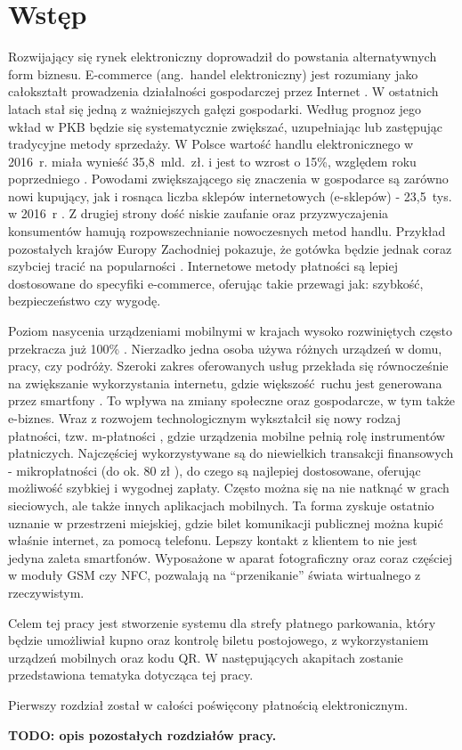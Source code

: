 \section*{Wstęp}

Rozwijający się rynek elektroniczny doprowadził do powstania alternatywnych form biznesu. E-commerce (ang.~handel elektroniczny) \cite{biblia_ebiznesu} jest rozumiany jako całokształt prowadzenia działalności gospodarczej przez Internet \cite{pieniadz_elektroniczny-analiza}. W ostatnich latach stał się jedną z ważniejszych gałęzi gospodarki. Według prognoz jego wkład w PKB będzie się systematycznie zwiększać, uzupełniając lub zastępując tradycyjne metody sprzedaży. W Polsce wartość handlu elektronicznego w 2016~r. miała wynieść 35,8~mld.~zł. i jest to wzrost o 15\%, względem roku poprzedniego \cite{barometr_radio}. Powodami zwiększającego się znaczenia w gospodarce są zarówno nowi kupujący, jak i rosnąca liczba sklepów internetowych (e-sklepów) - 23,5~tys. w 2016~r \cite{barometr_radio}. Z drugiej strony dość niskie zaufanie oraz przyzwyczajenia konsumentów hamują rozpowszechnianie nowoczesnych metod handlu. Przykład pozostałych krajów Europy Zachodniej pokazuje, że gotówka będzie jednak coraz szybciej tracić na popularności \cite{pieniadz_elektroniczny-analiza}. Internetowe metody płatności są lepiej dostosowane do specyfiki e-commerce, oferując takie przewagi jak: szybkość, bezpieczeństwo czy wygodę.

Poziom nasycenia urządzeniami mobilnymi w krajach wysoko rozwiniętych często przekracza już 100\% \cite{biblia_ebiznesu}. Nierzadko jedna osoba używa różnych urządzeń w domu, pracy, czy podróży. Szeroki zakres oferowanych usług przekłada się równocześnie na zwiększanie wykorzystania internetu, gdzie większość ruchu jest generowana przez smartfony \cite{ruch_mobilny-internet}. To wpływa na zmiany społeczne oraz gospodarcze, w tym także e-biznes. Wraz z rozwojem technologicznym wykształcił się nowy rodzaj płatności, tzw. m-płatności \cite{biblia_ebiznesu}, gdzie urządzenia mobilne pełnią rolę instrumentów płatniczych. Najczęściej wykorzystywane są do niewielkich transakcji finansowych - mikropłatności (do ok. 80 zł \cite{elektroniczne_metody_platnosci}), do czego są najlepiej dostosowane, oferując możliwość szybkiej i wygodnej zapłaty. Często można się na nie natknąć w grach sieciowych, ale także innych aplikacjach mobilnych. Ta forma zyskuje ostatnio uznanie w przestrzeni miejskiej, gdzie bilet komunikacji publicznej można kupić właśnie internet, za pomocą telefonu. Lepszy kontakt z klientem to nie jest jedyna zaleta smartfonów. Wyposażone w aparat fotograficzny oraz coraz częściej w moduły GSM czy NFC, pozwalają na ``przenikanie'' świata wirtualnego z rzeczywistym. 

Celem tej pracy jest stworzenie systemu dla strefy płatnego parkowania, który będzie umożliwiał kupno oraz kontrolę biletu postojowego, z wykorzystaniem urządzeń mobilnych oraz kodu QR. W następujących akapitach zostanie przedstawiona tematyka dotycząca tej pracy.

Pierwszy rozdział został w całości poświęcony płatnością elektronicznym. 

\textbf{TODO: opis pozostałych rozdziałów pracy.}

